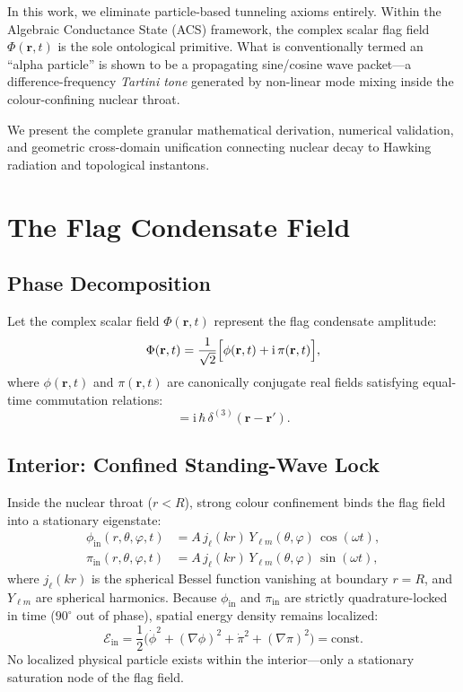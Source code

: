 \documentclass[11pt,a4paper]{article}
\theoremstyle{remark}
\newcommand{\ii}{\mathrm{i}}
\begin{document}
In this work, we eliminate particle-based tunneling axioms entirely. Within the Algebraic Conductance State (ACS) framework, the complex scalar flag field $\Phi(\mathbf{r},t)$ is the sole ontological primitive. What is conventionally termed an ``alpha particle'' is shown to be a propagating sine/cosine wave packet---a difference-frequency \emph{Tartini tone} generated by non-linear mode mixing inside the colour-confining nuclear throat.

We present the complete granular mathematical derivation, numerical validation, and geometric cross-domain unification connecting nuclear decay to Hawking radiation and topological instantons.

\section{The Flag Condensate Field}

\subsection{Phase Decomposition}
Let the complex scalar field $\Phi(\mathbf{r},t)$ represent the flag condensate amplitude:
\begin{equation}
\Phi(\mathbf{r},t) = \frac{1}{\sqrt{2}}\Bigl[\phi(\mathbf{r},t) + \ii\,\pi(\mathbf{r},t)\Bigr],
\end{equation}
where $\phi(\mathbf{r},t)$ and $\pi(\mathbf{r},t)$ are canonically conjugate real fields satisfying equal-time commutation relations:
\begin{equation}
[\phi(\mathbf{r},t), \pi(\mathbf{r}',t)] = \ii\,\hbar\,\delta^{(3)}(\mathbf{r} - \mathbf{r}').
\end{equation}

\subsection{Interior: Confined Standing-Wave Lock}
Inside the nuclear throat ($r < R$), strong colour confinement binds the flag field into a stationary eigenstate:
\begin{align}
\phi_{\text{in}}(r,\theta,\varphi,t) &= A\,j_\ell(k r)\,Y_{\ell m}(\theta,\varphi)\,\cos(\omega t), \\
\pi_{\text{in}}(r,\theta,\varphi,t) &= A\,j_\ell(k r)\,Y_{\ell m}(\theta,\varphi)\,\sin(\omega t),
\end{align}
where $j_\ell(kr)$ is the spherical Bessel function vanishing at boundary $r=R$, and $Y_{\ell m}$ are spherical harmonics. Because $\phi_{\text{in}}$ and $\pi_{\text{in}}$ are strictly quadrature-locked in time ($90^\circ$ out of phase), spatial energy density remains localized:
\begin{equation}
\mathcal{E}_{\text{in}} = \frac{1}{2}\bigl(\dot{\phi}^2 + (\nabla\phi)^2 + \dot{\pi}^2 + (\nabla\pi)^2\bigr) = \text{const}.
\end{equation}
No localized physical particle exists within the interior---only a stationary saturation node of the flag field.
\end{document}
